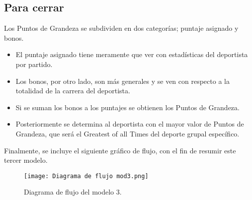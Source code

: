 \documentclass[a4paper]{article}
\begin{document}
\subsection{Para cerrar}
Los Puntos de Grandeza se subdividen en dos categorías; puntaje asignado y bonos. 
\begin{itemize}
    \item El puntaje asignado tiene meramente que ver con estadísticas del deportista por partido. 
    \item Los bonos, por otro lado, son más generales y se ven con respecto a la totalidad de la carrera del deportista.
    \item Si se suman los bonos a los puntajes se obtienen los Puntos de Grandeza.
    \item Posteriormente se determina al deportista con el mayor valor de Puntos de Grandeza, que será el Greatest of all Times del deporte grupal específico.
\end{itemize}
   Finalmente, se incluye el siguiente gráfico de flujo, con el fin de resumir este tercer modelo. 
\begin{figure}[H]
    \begin{center}
    \texttt{[image: Diagrama de flujo mod3.png]}    
    \end{center}    
    \caption{Diagrama de flujo del modelo 3.}
\end{figure}


\newpage 
\end{document}
